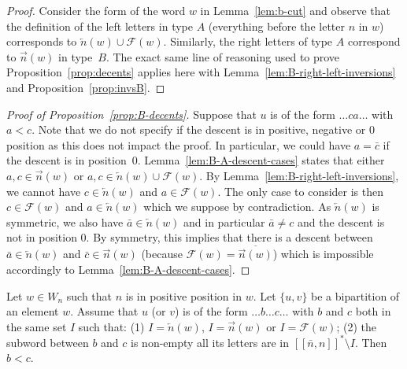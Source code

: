 \documentclass[Unicode]{cedram-alco}
\theoremstyle{definition}
\newcommand{\R}{{\overrightarrow{n}}}
\newcommand{\LL}{{\overleftarrow{n}}}
\newcommand{\Bsetnn}{[\![\bar{n},n ]\!]^*}
\newcommand{\F}{\mathcal{F}}
\begin{document}
\begin{proof}
Consider the form of the word $w$ in Lemma~\ref{lem:b-cut} and observe that the definition of the left letters in type $A$ (everything before the letter $n$ in $w$) corresponds to $\LL(w) \cup \F(w)$. Similarly, the right letters of type $A$ correspond to $\R(w)$ in type~$B$. The exact same line of reasoning used to prove Proposition~\ref{prop:decents} applies here with Lemma~\ref{lem:B-right-left-inversions} and Proposition~\ref{prop:invsB}.
\end{proof}

\begin{proof}[Proof of Proposition~\ref{prop:B-decents}]
Suppose that $u$ is of the form $\dots ca \dots$ with $a < c$. Note that we do not specify if the descent is in positive, negative or $0$ position as this does not impact the proof. In particular, we could have $a = \bar c$ if the descent is in position~$0$.  Lemma~\ref{lem:B-A-descent-cases} states that either $a,c \in \R(w)$ or $a,c \in \LL(w) \cup \F(w)$. By Lemma~\ref{lem:B-right-left-inversions}, we cannot have $c \in \LL(w)$ and $a \in \F(w)$. The only case to consider is then $c \in \F(w)$ and $a \in \LL(w)$ which we suppose by contradiction. As $\LL(w)$ is symmetric, we also have $\bar a \in \LL(w)$ and in particular $\bar a \neq c$ and the descent is not in position $0$. By symmetry, this implies that there is a descent between $\bar a \in \LL(w)$ and $\bar c \in \R(w)$ (because $\F(w) = \overline{\R(w)}$) which is impossible accordingly to Lemma~\ref{lem:B-A-descent-cases}.
\end{proof}

\begin{prop}
\label{prop:B-no-extra-desc}
Let $w\in W_n$ such that $n$ is in positive position in $w$. Let $\lbrace u, v \rbrace$ be a bipartition of an element $w$.  Assume that $u$ (or $v$) is of the form $\dots b \dots c \dots$ with $b$ and $c$  both in the same set $I$ such that: (1)  $I=\LL(w)$, $I=\R(w)$ or $I=\F(w)$; (2) the subword between $b$ and $c$ is non-empty  all its letters are in $\Bsetnn\setminus I$. Then $b < c$.
\end{prop}
\end{document}
